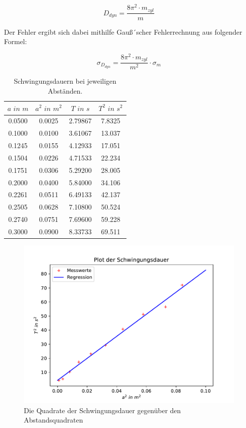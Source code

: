 \begin{equation}
  D_{dyn} = \frac{8\pi^2 \cdot m_{zyl}}{m}
\end{equation}

Der Fehler ergibt sich dabei mithilfe Gauß´scher Fehlerrechnung aus folgender Formel:

\begin{equation}
  \sigma_{D_{dyn}} = \frac{8 \pi^2 \cdot m_{zyl}}{m^2} \cdot \sigma_m
\end{equation}

\begin{table}
  \centering
  \caption{Schwingungsdauern bei jeweiligen Abständen.}
  \label{tab:data2}
  \begin{tabular}{c c c c }
    \toprule $a \, \,  in \,\, m$ & $a^2 \,\, in \,\,  m^2$ & $T \,\, in \,\, s$ & $T^2 \,\, in  \,\, s^2$ \\
    \midrule
    0.0500 & 0.0025 & 2.79867 &  7.8325\\
    0.1000 & 0.0100 & 3.61067 &  13.037\\
    0.1245 & 0.0155 & 4.12933 &  17.051\\
    0.1504 & 0.0226 & 4.71533 &  22.234\\
    0.1751 & 0.0306 & 5.29200 &  28.005\\
    0.2000 & 0.0400 & 5.84000 &  34.106\\
    0.2261 & 0.0511 & 6.49133 &  42.137\\
    0.2505 & 0.0628 & 7.10800 &  50.524\\
    0.2740 & 0.0751 & 7.69600 &  59.228\\
    0.3000 & 0.0900 & 8.33733 &  69.511\\
    \bottomrule
  \end{tabular}
\end{table}

\begin{figure}
  \includegraphics[width=\textwidth]{plot1.pdf}
  \caption{Die Quadrate der Schwingungsdauer gegenüber den Abstandsquadraten}
\end{figure}

